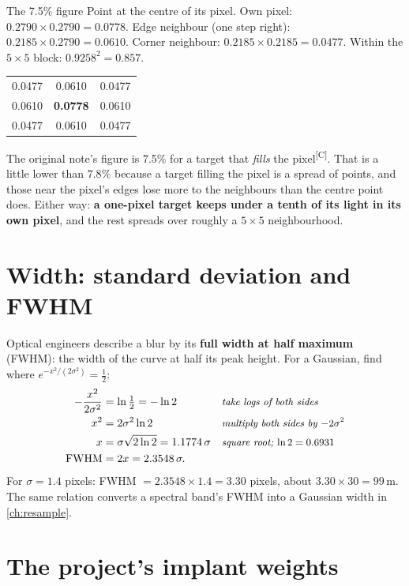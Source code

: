 \documentclass[11pt,a4paper,oneside,openany]{book}
\newcommand{\comp}{\textsuperscript{\textsf{\scriptsize[C]}}}
\newcommand{\why}[1]{&&\text{\small\itshape #1}}
\begin{document}
\begin{worked}[label=we:psf2d]{The 7.5\% figure}
Point at the centre of its pixel. Own pixel: $0.2790\times0.2790=0.0778$. Edge neighbour (one step right):
$0.2185\times0.2790=0.0610$. Corner neighbour: $0.2185\times0.2185=0.0477$. Within the $5\times5$ block: $0.9258^2=0.857$.
\begin{center}
\begin{tabular}{ccc}
0.0477 & 0.0610 & 0.0477\\
0.0610 & \textbf{0.0778} & 0.0610\\
0.0477 & 0.0610 & 0.0477
\end{tabular}
\end{center}
The original note's figure is 7.5\% for a target that \emph{fills} the pixel\comp. That is a little lower than $7.8\%$ because a target
filling the pixel is a spread of points, and those near the pixel's edges lose more to the neighbours than the centre point does.
Either way: \textbf{a one-pixel target keeps under a tenth of its light in its own pixel}, and the rest spreads over roughly a
$5\times5$ neighbourhood.
\end{worked}

\section{Width: standard deviation and FWHM}

Optical engineers describe a blur by its \textbf{full width at half maximum} (FWHM): the width of the curve at half its peak height.
For a Gaussian, find where $e^{-x^2/(2\sigma^2)}=\frac12$:
\begin{align*}
-\frac{x^2}{2\sigma^2} &= \ln\tfrac12=-\ln2 \why{take logs of both sides}\\
x^2 &= 2\sigma^2\ln2 \why{multiply both sides by $-2\sigma^2$}\\
x &= \sigma\sqrt{2\ln2}=1.1774\,\sigma \why{square root; $\ln2=0.6931$}\\
\text{FWHM} &= 2x=2.3548\,\sigma .
\end{align*}
For $\sigma=1.4$ pixels: FWHM $=2.3548\times1.4=3.30$ pixels, about $3.30\times30=99$\,m. The same relation converts a spectral band's
FWHM into a Gaussian width in \cref{ch:resample}.

\section{The project's implant weights}
\end{document}
